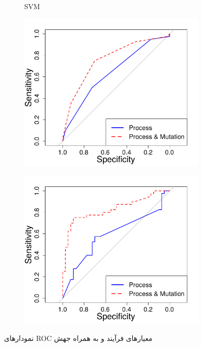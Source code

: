 \begin{figure}[H]
\begin{subfigure}{.5\textwidth}
	\caption{SVM}
\end{subfigure}
	\begin{subfigure}{.5\textwidth}
	\centering
	\includegraphics[width= \linewidth]{img/evaluation/phase1-roc-lr.pdf}
	\caption{}
\end{subfigure}
	\begin{subfigure}{.5\textwidth}
	\centering
	\includegraphics[width= \linewidth]{img/evaluation/phase1-roc-nn.pdf}
	\caption{}
\end{subfigure}
\caption{نمودارهای ROC معیارهای فرآیند و به همراه جهش}
\label{fig:ROC-phase1}
\end{figure}

